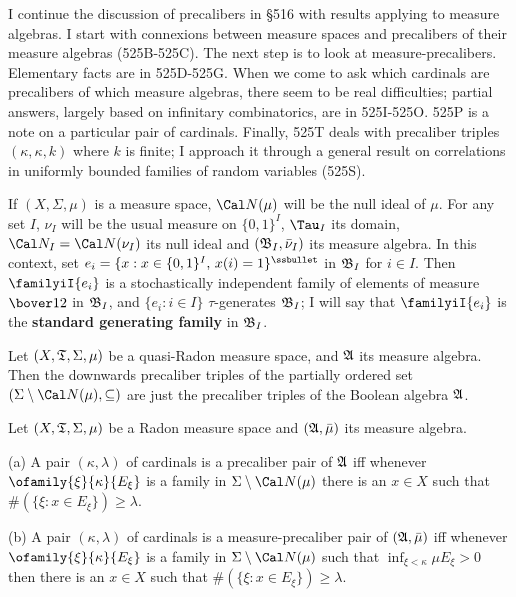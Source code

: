 I continue the discussion of precalibers in \S516 with results applying
to measure algebras.   I start with connexions between measure spaces
and precalibers of their measure algebras (525B-525C). %
The next step is to look at measure-precalibers.   Elementary facts are
in 525D-525G. %
When we come to ask which cardinals are precalibers of which measure
algebras, there seem to be real difficulties;  partial answers, largely
based on infinitary combinatorics, are in
525I-525O.  %
525P is a note on a particular pair of cardinals.   Finally, 525T deals
with precaliber triples $(\kappa,\kappa,k)$ where
$k$ is finite;  I approach it through a general result on correlations
in uniformly bounded families of random variables (525S).

 If $(X,\Sigma,\mu)$ is a measure space,
$\Cal N(\mu)$ will be the null ideal of $\mu$.   For any set
$I$, $\nu_I$ will be the usual measure on $\{0,1\}^I$, $\Tau_I$ its
domain, $\Cal N_I=\Cal N(\nu_I)$ its null ideal and
$(\frak B_I,\bar\nu_I)$ its measure algebra.
In this context, set $e_i=\{x:x\in\{0,1\}^I,\,x(i)=1\}^{\ssbullet}$
in $\frak B_I$ for $i\in I$.
Then $\familyiI{e_i}$ is a stochastically independent
family of elements of measure $\bover12$ in $\frak B_I$, and
$\{e_i:i\in I\}\,\,\tau$-generates $\frak B_I$;  I will say that
$\familyiI{e_i}$ is the {\bf standard generating family} in $\frak B_I$.

 Let $(X,\frak T,\Sigma,\mu)$ be a quasi-Radon
measure space, and $\frak A$ its measure algebra.   Then the downwards
precaliber triples of the partially
ordered set $(\Sigma\setminus\Cal N(\mu),\subseteq)$ are just the
precaliber triples of the Boolean algebra $\frak A$.


 Let $(X,\frak T,\Sigma,\mu)$ be a Radon measure
space and $(\frak A,\bar\mu)$ its measure algebra.

(a) A pair $(\kappa,\lambda)$ of cardinals is a precaliber pair of
$\frak A$ iff whenever $\ofamily{\xi}{\kappa}{E_{\xi}}$ is a family in
$\Sigma\setminus\Cal N(\mu)$ there is an $x\in X$ such that
$\#(\{\xi:x\in E_{\xi}\})\ge\lambda$.

(b) A pair $(\kappa,\lambda)$ of cardinals is a measure-precaliber pair
of $(\frak A,\bar\mu)$ iff whenever $\ofamily{\xi}{\kappa}{E_{\xi}}$ is
a family in $\Sigma\setminus\Cal N(\mu)$ such that
$\inf_{\xi<\kappa}\mu E_{\xi}>0$ then there is an $x\in X$ such that
$\#(\{\xi:x\in E_{\xi}\})\ge\lambda$.

